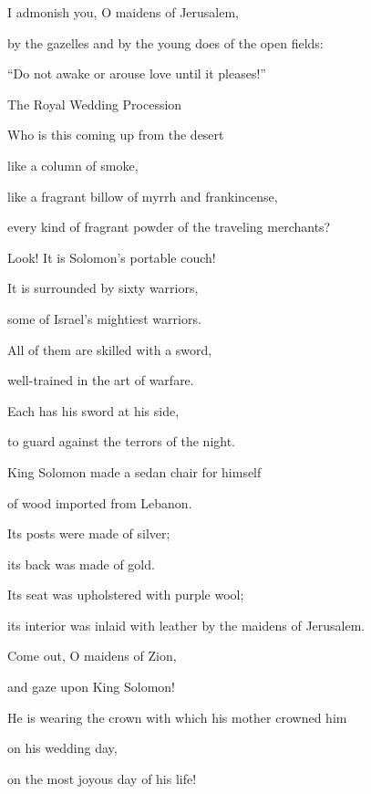 {\par }{\Q {}I
admonish you,
O maidens of
Jerusalem,
\par }{\Q by
the gazelles and
by the young does of
the open fields:
\par }{\Q “Do
not
awake
or arouse
love
until
it
pleases!”
\par }{\SH The Royal Wedding Procession
\par }{\SH 
{}
\par }{\Q {}Who
is this
coming up
from
the desert
\par }{\Q like a column
of smoke,
\par }{\Q like a fragrant billow
of myrrh
and frankincense,
\par }{\Q every kind
of fragrant powder
of the traveling merchants?
\par }{\Q {}Look! It is Solomon’s
portable couch!

\par }{\Q It is surrounded
by sixty
warriors,
\par }{\Q some of Israel’s
mightiest warriors.
\par }{\Q {}All
of them are skilled
with a sword,
\par }{\Q well-trained
in the art of warfare.
\par }{\Q Each
has his sword
at his side,
\par }{\Q to guard against
the terrors
of the night.
\par }{\Q {}King
Solomon
made
a sedan
chair for himself
\par }{\Q of wood
imported from Lebanon.
\par }{\Q {}Its posts
were made
of silver;
\par }{\Q its back
was made of gold.
\par }{\Q Its seat
was upholstered with purple
wool;

\par }{\Q its interior
was inlaid
with leather
by the maidens
of Jerusalem.
\par }{\Q {}Come out,
O maidens
of Zion,
\par }{\Q and gaze
upon King
Solomon!
\par }{\Q He is wearing the crown
with which his mother
crowned
him
\par }{\Q on his wedding
day,
\par }{\Q on the most joyous
day
of his life!

\par }
